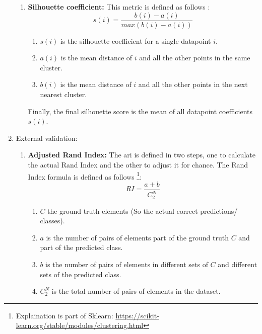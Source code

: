 \begin{enumerate}
\begin{enumerate}
          \item \textbf{Silhouette coefficient:} This metric is defined as follows \citep{liu_understanding_2010,rousseeuw_silhouettes_1987}:
                \begin{equation}
                  s(i) = \frac{b(i) - a(i)}{max(b(i) - a(i))}
                \end{equation}
                \begin{enumerate}
                  \item $s(i)$ is the silhouette coefficient for a single datapoint $i$.
                  \item $a(i)$ is the mean distance of $i$ and all the other points in the same cluster.
                  \item $b(i)$ is the mean distance of $i$ and all the other points in the next nearest cluster.
                \end{enumerate}
                Finally, the final silhouette score is the mean of all datapoint coefficients $s(i)$.
        \end{enumerate}
  \item External validation:
        \begin{enumerate}
          \item \textbf{Adjusted Rand Index:}
                The \gls{ari} is defined in two steps, one to calculate the actual Rand Index and the other to adjust it for chance.
                The Rand Index formula is defined as follows \citep{hubert_comparing_1985}\footnote{Explaination is part of Sklearn: \url{https://scikit-learn.org/stable/modules/clustering.html}}:
                \begin{equation}
                  RI = \frac{a + b}{C_2^N}
                \end{equation}
                \begin{enumerate}
                  \item $C$ the ground truth elements (So the actual correct predictions/ classes).
                  \item $a$ is the number of pairs of elements part of the ground truth $C$ and part of the predicted class.
                  \item $b$ is the number of pairs of elements in different sets of $C$ and different sets of the predicted class.
                  \item $C_2^N$ is the total number of pairs of elements in the dataset.
                \end{enumerate}

\end{enumerate}
\end{enumerate}
